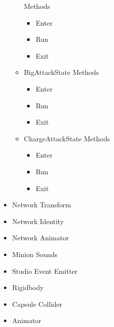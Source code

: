 \documentclass[11pt]{article}
\begin{document}
\begin{itemize}
\begin{itemize}
		\newline Methods
		\begin{itemize}
			\item Enter
			\item Run
			\item Exit
		\end{itemize}
		\item BigAttackState
		\newline Methods
		\begin{itemize}
			\item Enter
			\item Run
			\item Exit
		\end{itemize}
		\item ChargeAttackState
		\newline Methods
		\begin{itemize}
			\item Enter
			\item Run
			\item Exit
		\end{itemize}
	\end{itemize}
	\item Network Transform
	\item Network Identity
	\item Network Animator
	\item Minion Sounds
	\item Studio Event Emitter
	\item Rigidbody
	\item Capsule Collider
	\item Animator
\end{itemize}
\end{document}
